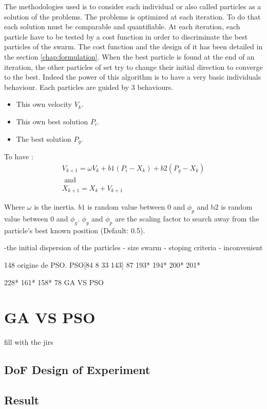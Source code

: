The methodologies used is to consider each individual or also called particles as a solution of the problems. The problems is optimized at each iteration. To do that each solution must be comparable and quantifiable. At each iteration, each particle have to be tested by a cost function in order to discriminate the best particles of the swarm. The cost function and the design of it has been detailed in the section \ref{chap:formulation}.
When the best particle is found at the end of an iteration, the other particles of set try to change their initial direction to converge to the best. 
Indeed the power of this algorithm is to have a very basic individuals behaviour. 
Each particles are guided by 3 behaviours.
 \begin{itemize}
 \item  This own velocity $V_k$. 
 \item  This own best solution $P_i$.
 \item  The best solution $P_g$.
\end{itemize}  

To have :
\begin{equation}
\begin{split}
 V_{k+1}= \omega V_k +b1(P_i -X_k)+b2(P_g-X_k)
\\
\mbox{ and } \\ X_{k+1}=X_k+V_{k+1}
\end{split}
\end{equation}

Where $\omega$ is the inertia. $b1$ is random value between 0 and $\phi_p$ and b2 is random value between 0 and $\phi_g$. $\phi_g$ and $\phi_p$  are the scaling factor to search away from the particle’s best known position (Default: 0.5). 


-the initial dispersion of the particles 
- size swarm
- stoping criteria 
- inconvenient 


148 origine de PSO. 
PSO[84 8 33 143] 87 193* 194* 200* 201* 

228* 161* 158* 78 GA VS PSO

\section{GA VS PSO }\label{sec:GAvsPSO} 
fill with the jirs 
	\subsection{DoF Design of Experiment}
	\subsection{Result}
